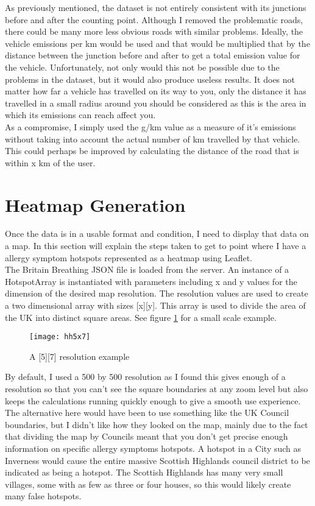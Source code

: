 As previously mentioned, the dataset is not entirely consistent with its junctions before and after the counting point. Although I removed the problematic roads, there could be many more less obvious roads with similar problems. Ideally, the vehicle emissions per km would be used and that would be multiplied that by the distance between the junction before and after to get a total emission value for the vehicle. Unfortunately, not only would this not be possible due to the problems in the dataset, but it would also produce useless results. It does not matter how far a vehicle has travelled on its way to you, only the distance it has travelled in a small radius around you should be considered as this is the area in which its emissions can reach affect you.\\

As a compromise, I simply used the g/km value as a measure of it's emissions without taking into account the actual number of km travelled by that vehicle. This could perhaps be improved by calculating the distance of the road that is within x km of the user.

\section{Heatmap Generation}

Once the data is in a usable format and condition, I need to display that data on a map. In this section will explain the steps taken to get to point where I have a allergy symptom hotspots represented as a heatmap using Leaflet.\\

The Britain Breathing JSON file is loaded from the server. An instance of a HotspotArray is instantiated with parameters including x and y values for the dimension of the desired map resolution. The resolution values are used to create a two dimensional array with sizes [x][y]. This array is used to divide the area of the UK into distinct square areas. See figure \ref{fig:hh} for a small scale example.

\begin{figure}[H]
\begin{center}
\texttt{[image: hh5x7]}
\caption{A [5][7] resolution example}
\label{fig:hh}
\end{center}
\end{figure}

By default, I used a 500 by 500 resolution as I found this gives enough of a resolution so that you can't see the square boundaries at any zoom level but also keeps the calculations running quickly enough to give a smooth use experience. The alternative here would have been to use something like the UK Council boundaries, but I didn't like how they looked on the map, mainly due to the fact that dividing the map by Councils meant that you don't get precise enough information on specific allergy symptoms hotspots. A hotspot in a City such as Inverness would cause the entire massive Scottish Highlands council district to be indicated as being a hotspot. The Scottish Highlands has many very small villages, some with as few as three or four houses, so this would likely create many false hotspots.\\

